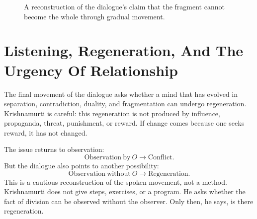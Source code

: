 \begin{figure}
\centering
{}
\caption{A reconstruction of the dialogue's claim that the fragment cannot become the whole through gradual movement.}
\end{figure}

\section{Listening, Regeneration, And The Urgency Of Relationship}

The final movement of the dialogue asks whether a mind that has evolved in separation, contradiction, duality, and fragmentation can undergo regeneration. Krishnamurti is careful: this regeneration is not produced by influence, propaganda, threat, punishment, or reward. If change comes because one seeks reward, it has not changed.

The issue returns to observation:
\begin{equation}
\mathrm{Observation\ by\ } O \longrightarrow \mathrm{Conflict}.
\end{equation}
But the dialogue also points to another possibility:
\begin{equation}
\mathrm{Observation\ without\ } O
\longrightarrow
\mathrm{Regeneration}.
\end{equation}
This is a cautious reconstruction of the spoken movement, not a method. Krishnamurti does not give steps, exercises, or a program. He asks whether the fact of division can be observed without the observer. Only then, he says, is there regeneration.

